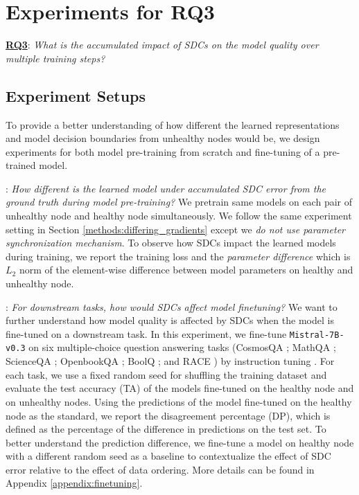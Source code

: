 \section{Experiments for RQ3} \label{sec:multiple_training_steps}


\underline{\textbf{RQ3}}: \emph{What is the accumulated impact of SDCs on the model quality over multiple training steps?}

\subsection{Experiment Setups}
To provide a better understanding of how different the learned representations and model decision boundaries from unhealthy nodes would be, we design experiments for both model pre-training from scratch and fine-tuning of a pre-trained model.

\textbf{}: \emph{How different is the learned model under accumulated SDC error from the ground truth during model pre-training?} 
We pretrain same models on each pair of unhealthy node and healthy node simultaneously. We follow the same experiment setting in Section \ref{methods:differing_gradients} except we \emph{do not use parameter synchronization mechanism}. To observe how SDCs impact the learned models during training, we report the training loss and the \emph{parameter difference} which is $L_2$ norm of the element-wise difference between model parameters on healthy and unhealthy node.

\textbf{}: \emph{For downstream tasks, how would SDCs affect model finetuning?} 
We want to further understand how model quality is affected by SDCs when the model is fine-tuned on a downstream task. 
In this experiment, we fine-tune \verb|Mistral-7B-v0.3| \cite{jiang2023mistral7b} on six multiple-choice question answering tasks (CosmosQA \cite{cosmos-qa}; MathQA \cite{mathqadataset}; ScienceQA \cite{lu2022learn}; OpenbookQA \cite{OpenBookQA2018}; BoolQ \cite{clark2019boolqexploringsurprisingdifficulty}; and RACE \cite{raceLai2017large}) by instruction tuning \cite{weifinetuned}. 
For each task, we use a fixed random seed for shuffling the training dataset and evaluate the test accuracy (TA) of the models fine-tuned on the healthy node and on unhealthy nodes. Using the predictions of the model fine-tuned on the healthy node as the standard, we report the disagreement percentage (DP), which is defined as the percentage of the difference in predictions on the test set. To better understand the prediction difference, we fine-tune a model on healthy node with a different random seed as a baseline to contextualize the effect of SDC error relative to the effect of data ordering. More details can be found in Appendix \ref{appendix:finetuning}.

